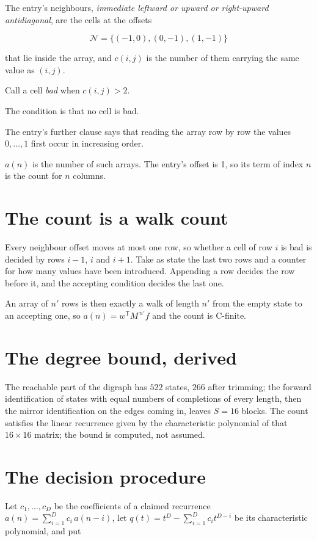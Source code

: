 \documentclass[11pt]{article}
\theoremstyle{definition}
\begin{document}
The entry's neighbours, {\itshape immediate leftward or upward or right-upward antidiagonal}, are the cells at the offsets

\[\mathcal{N} = \{(-1,0), (0,-1), (1,-1)\}\]

that lie inside the array, and $c(i,j)$ is the number of them carrying the same value as $(i,j)$.

Call a cell {\itshape bad} when $c(i,j) > 2$.

The condition is that no cell is bad.

The entry's further clause says that reading the array row by row the values $0,\dots,1$ first occur in increasing order.

$a(n)$ is the number of such arrays. The entry's offset is 1, so its term of index $n$ is the count for $n$ columns.

\section{The count is a walk count}

Every neighbour offset moves at most one row, so whether a cell of row $i$ is bad is decided by rows $i-1$, $i$ and $i+1$. Take as state the last two rows and a counter for how many values have been introduced. Appending a row decides the row before it, and the accepting condition decides the last one.

An array of $n'$ rows is then exactly a walk of length $n'$ from the empty state to an accepting one, so $a(n) = w^{\mathsf T}M^{\,n'}f$ and the count is C-finite.

\section{The degree bound, derived}

The reachable part of the digraph has $522$ states, $266$ after trimming; the forward identification of states with equal numbers of completions of every length, then the mirror identification on the edges coming in, leaves $S = 16$ blocks. The count satisfies the linear recurrence given by the characteristic polynomial of that $16\times16$ matrix; the bound is computed, not assumed.

\section{The decision procedure}

Let $c_1,\dots,c_D$ be the coefficients of a claimed recurrence $a(n) = \sum_{i=1}^{D} c_i\,a(n-i)$, let $q(t) = t^{D} - \sum_{i=1}^{D} c_i t^{D-i}$ be its characteristic polynomial, and put
\end{document}
